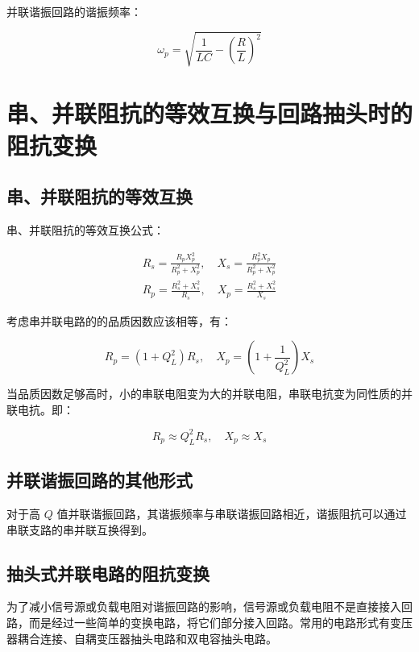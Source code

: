 并联谐振回路的谐振频率：

\begin{equation}
    \omega_p = \sqrt{\frac{1}{LC} - \left(\frac{R}{L}\right)^2}
\end{equation}

\section{串、并联阻抗的等效互换与回路抽头时的阻抗变换}

\subsection{串、并联阻抗的等效互换}

串、并联阻抗的等效互换公式：

\begin{equation}
\begin{aligned}
    R_s = \frac{R_p X_p^2}{R_p^2 + X_p^2}, \quad X_s = \frac{R_p^2 X_p}{R_p^2 + X_p^2} \\
    R_p = \frac{R_s^2 + X_s^2}{R_s}, \quad X_p = \frac{R_s^2 + X_s^2}{X_s}
\end{aligned}
\end{equation}

考虑串并联电路的的品质因数应该相等，有：

\begin{equation}
    R_p = \left(1 + Q_L^2\right) R_s, \quad X_p = \left(1 + \frac{1}{Q_L^2} \right) X_s
\end{equation}

当品质因数足够高时，小的串联电阻变为大的并联电阻，串联电抗变为同性质的并联电抗。即：

\begin{equation}
    R_p \approx Q_L^2 R_s, \quad X_p \approx X_s
\end{equation}

\subsection{并联谐振回路的其他形式}

对于高 $Q$ 值并联谐振回路，其谐振频率与串联谐振回路相近，谐振阻抗可以通过串联支路的串并联互换得到。

\subsection{抽头式并联电路的阻抗变换}

为了减小信号源或负载电阻对谐振回路的影响，信号源或负载电阻不是直接接入回路，而是经过一些简单的变换电路，将它们部分接入回路。常用的电路形式有变压器耦合连接、自耦变压器抽头电路和双电容抽头电路。

